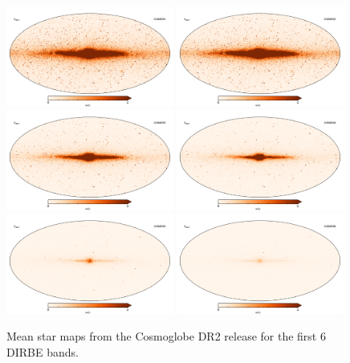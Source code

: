 \documentclass{aa}
\begin{document}
\begin{figure}
  \centering
  \includegraphics[width=0.49\textwidth]{figs/starmaps/stars_mean_01.pdf}
  \includegraphics[width=0.49\textwidth]{figs/starmaps/stars_mean_02.pdf} \\
  \includegraphics[width=0.49\textwidth]{figs/starmaps/stars_mean_03.pdf}
  \includegraphics[width=0.49\textwidth]{figs/starmaps/stars_mean_04.pdf} \\
  \includegraphics[width=0.49\textwidth]{figs/starmaps/stars_mean_05.pdf}
  \includegraphics[width=0.49\textwidth]{figs/starmaps/stars_mean_06.pdf} \\
  \caption{Mean star maps from the Cosmoglobe DR2 release for the first 6 DIRBE bands. }
  \label{fig:starsT}
\end{figure}
\end{document}
